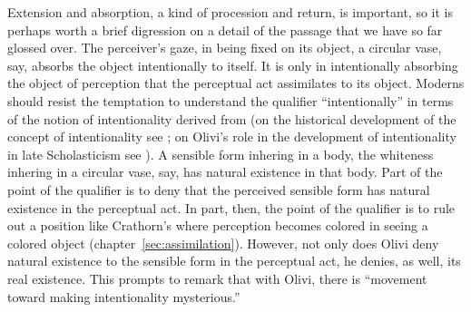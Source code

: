 Extension and absorption, a kind of procession and return, is important, so it is perhaps worth a brief digression on a detail of the passage that we have so far glossed over. The perceiver's gaze, in being fixed on its object, a circular vase, say, absorbs the object intentionally to itself. It is only in intentionally absorbing the object of perception that the perceptual act assimilates to its object. Moderns should resist the temptation to understand the qualifier ``intentionally'' in terms of the notion of intentionality derived from \citet{Brentano:1874aa} (on the historical development of the concept of intentionality see \citealt{Sorabji:2003fk}; on Olivi's role in the development of intentionality in late Scholasticism see \citealt[chapter 2]{Pasnau:1997aa}). A sensible form inhering in a body, the whiteness inhering in a circular vase, say, has natural existence in that body. Part of the point of the qualifier is to deny that the perceived sensible form has natural existence in the perceptual act. In part, then, the point of the qualifier is to rule out a position like Crathorn's where perception becomes colored in seeing a colored object (chapter~\ref{sec:assimilation}). However, not only does Olivi deny natural existence to the sensible form in the perceptual act, he denies, as well, its real existence. This prompts \citet[67]{Pasnau:1997aa} to remark that with Olivi, there is ``movement toward making intentionality mysterious.''

